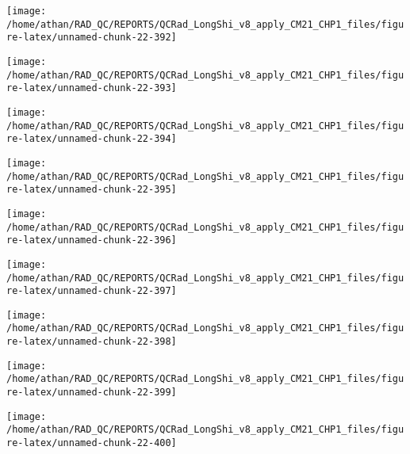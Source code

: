 \documentclass[
  10pt,
  a4paper,oneside]{article}
\begin{document}
\begin{center}\texttt{[image: /home/athan/RAD\_QC/REPORTS/QCRad\_LongShi\_v8\_apply\_CM21\_CHP1\_files/figure-latex/unnamed-chunk-22-392]} \end{center}

\begin{center}\texttt{[image: /home/athan/RAD\_QC/REPORTS/QCRad\_LongShi\_v8\_apply\_CM21\_CHP1\_files/figure-latex/unnamed-chunk-22-393]} \end{center}

\begin{center}\texttt{[image: /home/athan/RAD\_QC/REPORTS/QCRad\_LongShi\_v8\_apply\_CM21\_CHP1\_files/figure-latex/unnamed-chunk-22-394]} \end{center}

\begin{center}\texttt{[image: /home/athan/RAD\_QC/REPORTS/QCRad\_LongShi\_v8\_apply\_CM21\_CHP1\_files/figure-latex/unnamed-chunk-22-395]} \end{center}

\begin{center}\texttt{[image: /home/athan/RAD\_QC/REPORTS/QCRad\_LongShi\_v8\_apply\_CM21\_CHP1\_files/figure-latex/unnamed-chunk-22-396]} \end{center}

\begin{center}\texttt{[image: /home/athan/RAD\_QC/REPORTS/QCRad\_LongShi\_v8\_apply\_CM21\_CHP1\_files/figure-latex/unnamed-chunk-22-397]} \end{center}

\begin{center}\texttt{[image: /home/athan/RAD\_QC/REPORTS/QCRad\_LongShi\_v8\_apply\_CM21\_CHP1\_files/figure-latex/unnamed-chunk-22-398]} \end{center}

\begin{center}\texttt{[image: /home/athan/RAD\_QC/REPORTS/QCRad\_LongShi\_v8\_apply\_CM21\_CHP1\_files/figure-latex/unnamed-chunk-22-399]} \end{center}

\begin{center}\texttt{[image: /home/athan/RAD\_QC/REPORTS/QCRad\_LongShi\_v8\_apply\_CM21\_CHP1\_files/figure-latex/unnamed-chunk-22-400]} \end{center}
\end{document}
